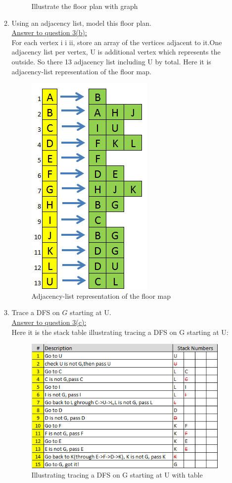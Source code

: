 \documentclass{article}
\begin{document}
\begin{enumerate}
\begin{enumerate}
\begin{figure}[h]
\caption{Illustrate the floor plan with graph}
\end{figure}
\item Using an adjacency list, model this floor plan.\\
\underline{Answer to question 3(b):}\\
For each vertex i i ii, store an array of the vertices adjacent to it.One adjacency list per vertex, U is additional vertex which represents the outside. So there 13 adjacency list including U by total. Here it is adjacency-list representation of the floor map.\\
\begin{figure}[h]
\includegraphics[width=0.3\columnwidth]{adjacentlistp3b}\centering 
\caption{Adjacency-list representation of the floor map}
\end{figure}
\item Trace a DFS on $G$ starting at \textsf{U}.\\
\underline{Answer to question 3(c):}\\
Here it is the stack table illustrating tracing a DFS on G starting at U:\\
\begin{figure}[h]
\includegraphics[width=0.6\columnwidth]{tracestackp3_1}\centering 
\caption{Illustrating tracing a DFS on G starting at U with table}
\end{figure}

\end{enumerate}
\end{enumerate}
\end{document}

